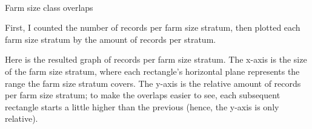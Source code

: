 \documentclass[11pt]{article}
\begin{document}
    \begin{center}
    \end{center}
    { \hspace*{\fill} \\}
    
    Farm size class overlaps

First, I counted the number of records per farm size stratum, then
plotted each farm size stratum by the amount of records per stratum.

Here is the resulted graph of records per farm size stratum. The x-axis
is the size of the farm size stratum, where each rectangle's horizontal
plane represents the range the farm size stratum covers. The y-axis is
the relative amount of records per farm size stratum; to make the
overlaps easier to see, each subsequent rectangle starts a little higher
than the previous (hence, the y-axis is only relative).
\end{document}

